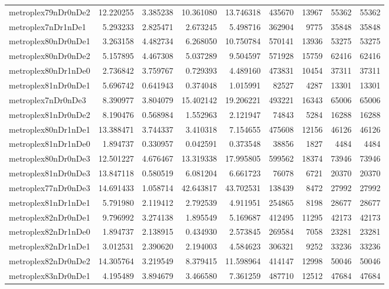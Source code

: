 \documentclass[../../../thesis.tex]{subfiles}
\begin{document}
\begin{longtable}{|l|r|r|r|r|r|r|r|r|}
metroplex79nDr0nDe2 & 12.220255 & 3.385238 & 10.361080 & 13.746318 & 435670 & 13967 & 55362 & 55362 \\
metroplex7nDr1nDe1 & 5.293233 & 2.825471 & 2.673245 & 5.498716 & 362904 & 9775 & 35848 & 35848 \\
metroplex80nDr0nDe1 & 3.263158 & 4.482734 & 6.268050 & 10.750784 & 570141 & 13936 & 53275 & 53275 \\
metroplex80nDr0nDe2 & 5.157895 & 4.467308 & 5.037289 & 9.504597 & 571928 & 15759 & 62416 & 62416 \\
metroplex80nDr1nDe0 & 2.736842 & 3.759767 & 0.729393 & 4.489160 & 473831 & 10454 & 37311 & 37311 \\
metroplex81nDr0nDe1 & 5.696742 & 0.641943 & 0.374048 & 1.015991 & 82527 & 4287 & 13301 & 13301 \\
metroplex7nDr0nDe3 & 8.390977 & 3.804079 & 15.402142 & 19.206221 & 493221 & 16343 & 65006 & 65006 \\
metroplex81nDr0nDe2 & 8.190476 & 0.568984 & 1.552963 & 2.121947 & 74843 & 5284 & 16288 & 16288 \\
metroplex80nDr1nDe1 & 13.388471 & 3.744337 & 3.410318 & 7.154655 & 475608 & 12156 & 46126 & 46126 \\
metroplex81nDr1nDe0 & 1.894737 & 0.330957 & 0.042591 & 0.373548 & 38856 & 1827 & 4484 & 4484 \\
metroplex80nDr0nDe3 & 12.501227 & 4.676467 & 13.319338 & 17.995805 & 599562 & 18374 & 73946 & 73946 \\
metroplex81nDr0nDe3 & 13.847118 & 0.580519 & 6.081204 & 6.661723 & 76078 & 6721 & 20370 & 20370 \\
metroplex77nDr0nDe3 & 14.691433 & 1.058714 & 42.643817 & 43.702531 & 138439 & 8472 & 27992 & 27992 \\
metroplex81nDr1nDe1 & 5.791980 & 2.119412 & 2.792539 & 4.911951 & 254865 & 8198 & 28677 & 28677 \\
metroplex82nDr0nDe1 & 9.796992 & 3.274138 & 1.895549 & 5.169687 & 412495 & 11295 & 42173 & 42173 \\
metroplex82nDr1nDe0 & 1.894737 & 2.138915 & 0.434930 & 2.573845 & 269584 & 7058 & 23281 & 23281 \\
metroplex82nDr1nDe1 & 3.012531 & 2.390620 & 2.194003 & 4.584623 & 306321 & 9252 & 33236 & 33236 \\
metroplex82nDr0nDe2 & 14.305764 & 3.219549 & 8.379415 & 11.598964 & 414147 & 12998 & 50046 & 50046 \\
metroplex83nDr0nDe1 & 4.195489 & 3.894679 & 3.466580 & 7.361259 & 487710 & 12512 & 47684 & 47684 \\

\end{longtable}
\end{document}
